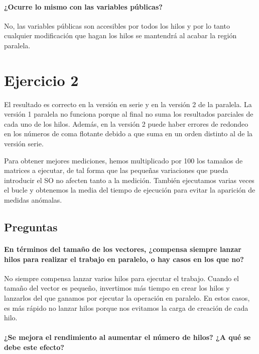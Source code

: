 \documentclass{apuntes}
\begin{document}
\paragraph{¿Ocurre lo mismo con las variables públicas?} 

No, las variables públicas son accesibles por todos los hilos y por lo tanto cualquier modificación que hagan los hilos se mantendrá al acabar la región paralela.

\section*{Ejercicio 2}

El resultado es correcto en la versión en serie y en la versión 2 de la paralela. La versión 1 paralela no funciona porque al final no suma los resultados parciales de cada uno de los hilos. Además, en la versión 2 puede haber errores de redondeo en los números de coma flotante debido a que suma en un orden distinto al de la versión serie.


Para obtener mejores mediciones, hemos multiplicado por 100 los tamaños de matrices a ejecutar, de tal forma que las pequeñas variaciones que pueda introducir el SO no afecten tanto a la medición. También ejecutamos varias veces el bucle y obtenemos la media del tiempo de ejecución para evitar la aparición de medidas anómalas.

\subsection*{Preguntas}

\paragraph{En términos del tamaño de los vectores, ¿compensa siempre lanzar hilos para realizar el trabajo en paralelo, o hay casos en los que no?} 

No siempre compensa lanzar varios hilos para ejecutar el trabajo. Cuando el tamaño del vector es pequeño, invertimos más tiempo en crear los hilos y lanzarlos del que ganamos por ejecutar la operación en paralelo. En estos casos, es más rápido no lanzar hilos porque nos evitamos la carga de creación de cada hilo.

\paragraph{¿Se mejora el rendimiento al aumentar el número de hilos? ¿A qué se debe este efecto?} 
\end{document}
